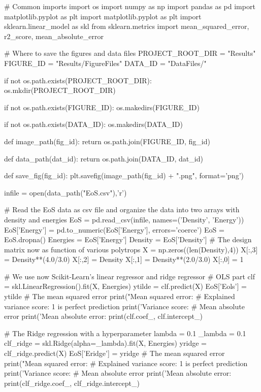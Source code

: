 \documentclass[%
oneside,                 %
final,                   %
10pt]{article}
\begin{document}
\bpycod
# Common imports
import os
import numpy as np
import pandas as pd
import matplotlib.pyplot as plt
import matplotlib.pyplot as plt
import sklearn.linear_model as skl
from sklearn.metrics import mean_squared_error, r2_score, mean_absolute_error

# Where to save the figures and data files
PROJECT_ROOT_DIR = "Results"
FIGURE_ID = "Results/FigureFiles"
DATA_ID = "DataFiles/"

if not os.path.exists(PROJECT_ROOT_DIR):
    os.mkdir(PROJECT_ROOT_DIR)

if not os.path.exists(FIGURE_ID):
    os.makedirs(FIGURE_ID)

if not os.path.exists(DATA_ID):
    os.makedirs(DATA_ID)

def image_path(fig_id):
    return os.path.join(FIGURE_ID, fig_id)

def data_path(dat_id):
    return os.path.join(DATA_ID, dat_id)

def save_fig(fig_id):
    plt.savefig(image_path(fig_id) + ".png", format='png')

infile = open(data_path("EoS.csv"),'r')

# Read the EoS data as  csv file and organize the data into two arrays with density and energies
EoS = pd.read_csv(infile, names=('Density', 'Energy'))
EoS['Energy'] = pd.to_numeric(EoS['Energy'], errors='coerce')
EoS = EoS.dropna()
Energies = EoS['Energy']
Density = EoS['Density']
#  The design matrix now as function of various polytrops
X = np.zeros((len(Density),4))
X[:,3] = Density**(4.0/3.0)
X[:,2] = Density
X[:,1] = Density**(2.0/3.0)
X[:,0] = 1

# We use now Scikit-Learn's linear regressor and ridge regressor
# OLS part
clf = skl.LinearRegression().fit(X, Energies)
ytilde = clf.predict(X)
EoS['Eols']  = ytilde
# The mean squared error                               
print("Mean squared error: %
# Explained variance score: 1 is perfect prediction                                 
print('Variance score: %
# Mean absolute error                                                           
print('Mean absolute error: %
print(clf.coef_, clf.intercept_)

# The Ridge regression with a hyperparameter lambda = 0.1
_lambda = 0.1
clf_ridge = skl.Ridge(alpha=_lambda).fit(X, Energies)
yridge = clf_ridge.predict(X)
EoS['Eridge']  = yridge
# The mean squared error                               
print("Mean squared error: %
# Explained variance score: 1 is perfect prediction                                 
print('Variance score: %
# Mean absolute error                                                           
print('Mean absolute error: %
print(clf_ridge.coef_, clf_ridge.intercept_)
\end{document}
